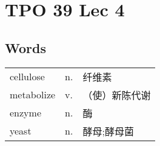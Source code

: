 \section{TPO 39 Lec 4}

\subsection{Words}

\begin{tabular}{lll}
    cellulose  & n. & 纤维素     \\
    metabolize & v. & （使）新陈代谢 \\
    enzyme     & n. & 酶       \\
    yeast      & n. & 酵母;酵母菌  \\
\end{tabular}
